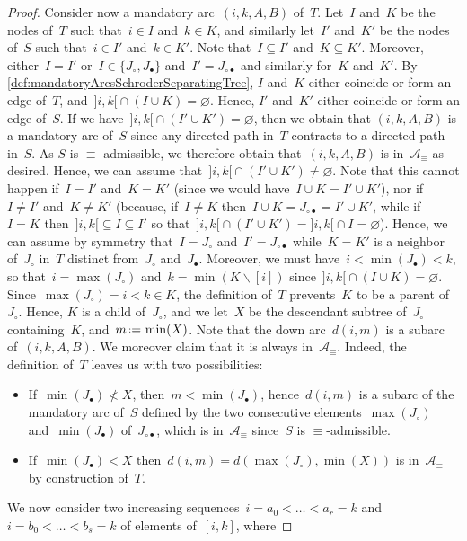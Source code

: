 \documentclass{amsart}
\theoremstyle{definition}
\newcommand{\ssm}{\smallsetminus} %
\newcommand{\eqdef}{\mbox{\,\raisebox{0.2ex}{\scriptsize\ensuremath{\mathrm:}}\ensuremath{=}\,}} %
\newcommand{\arcs}{{\mathcal{A}}} %
\begin{document}
\begin{proof}
Consider now a mandatory arc~$(i,k,A,B)$ of~$T$.
Let~$I$ and~$K$ be the nodes of~$T$ such that~$i \in I$ and~$k \in K$, and similarly let~$I'$ and~$K'$ be the nodes of~$S$ such that~$i \in I'$ and~$k \in K'$.
Note that~$I \subseteq I'$ and~$K \subseteq K'$.
Moreover, either~$I = I'$ or~$I \in \{J_\circ, J_\bullet\}$ and~$I' = J_{\circ\bullet}$ and similarly for~$K$ and~$K'$.
By \cref{def:mandatoryArcsSchroderSeparatingTree}, $I$ and~$K$ either coincide or form an edge of~$T$, and~${{]i,k[} \cap (I \cup K) = \varnothing}$.
Hence, $I'$ and~$K'$ either coincide or form an edge of~$S$.
If we have~${]i,k[} \cap (I' \cup K') = \varnothing$, then we obtain that $(i,k,A,B)$ is a mandatory arc of~$S$ since any directed path in~$T$ contracts to a directed path in~$S$.
As $S$ is $\equiv$-admissible, we therefore obtain that~$(i,k,A,B)$ is in~$\arcs_\equiv$ as desired.
Hence, we can assume that~${]i,k[} \cap (I' \cup K') \ne \varnothing$.
Note that this cannot happen if~$I = I'$ and~$K = K'$ (since we would have~$I \cup K = I' \cup K'$), nor if~$I \ne I'$ and~$K \ne K'$ (because, if~$I \ne K$ then~$I \cup K = J_{\circ\bullet} = I' \cup K'$, while if~$I = K$ then~${]i,k[} \subseteq I \subseteq I'$ so that~${]i,k[} \cap (I' \cup K') = {]i,k[} \cap I = \varnothing$).
Hence, we can assume by symmetry that~$I = J_\circ$ and~$I' = J_{\circ\bullet}$ while~$K = K'$ is a neighbor of~$J_\circ$ in~$T$ distinct from~$J_\circ$ and~$J_\bullet$.
Moreover, we must have~$i < \min(J_\bullet) < k$, so that~$i = \max(J_\circ)$ and~$k = \min(K \ssm [i])$ since~${{]i,k[} \cap (I \cup K) = \varnothing}$.
Since~$\max(J_\circ) = i < k \in K$, the definition of~$T$ prevents~$K$ to be a parent of~$J_\circ$.
Hence, $K$ is a child of~$J_\circ$, and we let~$X$ be the descendant subtree of~$J_\circ$ containing~$K$, and~$m \eqdef \min(X)$.
Note that the down arc~$d(i,m)$ is a subarc of~$(i,k,A,B)$.
We moreover claim that it is always in~$\arcs_\equiv$.
Indeed, the definition of~$T$ leaves us with two possibilities:
\begin{itemize}
\item If~$\min(J_\bullet) \not< X$, then~$m < \min(J_\bullet)$, hence~$d(i,m)$ is a subarc of the mandatory arc of~$S$ defined by the two consecutive elements~$\max(J_\circ)$ and~$\min(J_\bullet)$ of~$J_{\circ\bullet}$, which is in~$\arcs_\equiv$ since~$S$ is $\equiv$-admissible.
\item If~$\min(J_\bullet) < X$ then~$d(i,m) = d(\max(J_\circ), \min(X))$ is in~$\arcs_\equiv$ by construction of~$T$.
\end{itemize}
We now consider two increasing sequences~$i = a_0 < \dots < a_r = k$ and~$i = b_0 < \dots < b_s = k$ of elements of~$[i,k]$, where

\end{proof}
\end{document}
